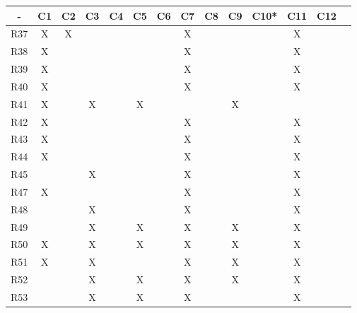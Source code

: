 \begin{table}[H]
\centering
\begin{tabular}{|c|c|c|c|c|c|c|c|c|c|c|c|c|c|} 
\hline
\rowcolor[rgb]{0.71,0.102,0} -     & C1 & C2 & C3 & C4 & C5 & C6 & C7 & C8 & C9 & C10* & C11 & C12  \\ 
\hline
{\cellcolor[rgb]{0.71,0.102,0}}R37 & X  & X  &    &    &    &    & X  &    &    &      & X   &      \\ 
\hline
{\cellcolor[rgb]{0.71,0.102,0}}R38 & X  &    &    &    &    &    & X  &    &    &      & X   &      \\ 
\hline
{\cellcolor[rgb]{0.71,0.102,0}}R39 & X  &    &    &    &    &    & X  &    &    &      & X   &      \\ 
\hline
{\cellcolor[rgb]{0.71,0.102,0}}R40 & X  &    &    &    &    &    & X  &    &    &      & X   &      \\ 
\hline
{\cellcolor[rgb]{0.71,0.102,0}}R41 & X  &    & X  &    & X  &    &    &    & X  &      &     &      \\ 
\hline
{\cellcolor[rgb]{0.71,0.102,0}}R42 & X  &    &    &    &    &    & X  &    &    &      & X   &      \\ 
\hline
{\cellcolor[rgb]{0.71,0.102,0}}R43 & X  &    &    &    &    &    & X  &    &    &      & X   &      \\ 
\hline
{\cellcolor[rgb]{0.71,0.102,0}}R44 & X  &    &    &    &    &    & X  &    &    &      & X   &      \\ 
\hline
{\cellcolor[rgb]{0.71,0.102,0}}R45 &    &    & X  &    &    &    & X  &    &    &      & X   &      \\ 
\hline
{\cellcolor[rgb]{0.71,0.102,0}}R47 & X  &    &    &    &    &    & X  &    &    &      & X   &      \\ 
\hline
{\cellcolor[rgb]{0.71,0.102,0}}R48 &    &    & X  &    &    &    & X  &    &    &      & X   &      \\ 
\hline
{\cellcolor[rgb]{0.71,0.102,0}}R49 &    &    & X  &    & X  &    & X  &    & X  &      & X   &      \\ 
\hline
{\cellcolor[rgb]{0.71,0.102,0}}R50 & X  &    & X  &    & X  &    & X  &    & X  &      & X   &      \\ 
\hline
{\cellcolor[rgb]{0.71,0.102,0}}R51 & X  &    & X  &    &    &    & X  &    & X  &      & X   &      \\ 
\hline
{\cellcolor[rgb]{0.71,0.102,0}}R52 &    &    & X  &    & X  &    & X  &    & X  &      & X   &      \\ 
\hline
{\cellcolor[rgb]{0.71,0.102,0}}R53 &    &    & X  &    & X  &    & X  &    &    &      & X   &      \\ 

\end{tabular}
\end{table}
